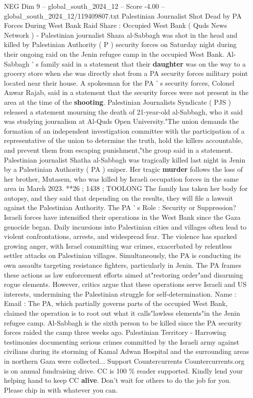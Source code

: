 \begin{textsample}{NEG Dim 9 – global\_south\_2024\_12 – Score -4.00 – global\_south\_2024\_12/119409807.txt}  \label{ex:f9_neg_220}
Palestinian Journalist Shot Dead by PA Forces During West Bank Raid Share : Occupied West Bank ( Quds News Network ) - Palestinian journalist Shaza al-Sabbagh was shot in the head and killed by Palestinian Authority ( P ) security forces on Saturday night during their ongoing raid on the Jenin refugee camp in the occupied West Bank.
Al-Sabbagh ' s family said in a statement that their \textbf{daughter} was on the way to a grocery store when she was directly shot from a PA security forces military point located near their house.
A spokesman for the PA ' s security forces, Colonel Anwar Rajab, said in a statement that the security forces were not present in the area at the time of the \textbf{shooting}.
Palestinian Journalists Syndicate ( PJS ) released a statement mourning the death of 21-year-old al-Sabbagh, who it said was studying journalism at Al-Quds Open University."The union demands the formation of an independent investigation committee with the participation of a representative of the union to determine the truth, hold the killers accountable, and prevent them from escaping punishment,"the group said in a statement.
Palestinian journalist Shatha al-Sabbagh was tragically killed last night in Jenin by a Palestinian Authority ( PA ) sniper.
Her tragic \textbf{murder} follows the loss of her brother, Mutasem, who was killed by Israeli occupation forces in the same area in March 2023. **26 ; 1438 ; TOOLONG The family has taken her body for autopsy, and they said that depending on the results, they will file a lawsuit against the Palestinian Authority.
The PA ' s Role : Security or Suppression?
Israeli forces have intensified their operations in the West Bank since the Gaza genocide began.
Daily incursions into Palestinian cities and villages often lead to violent confrontations, arrests, and widespread fear.
The violence has sparked growing anger, with Israel committing war crimes, exacerbated by relentless settler attacks on Palestinian villages.
Simultaneously, the PA is conducting its own assaults targeting resistance fighters, particularly in Jenin.
The PA frames these actions as law enforcement efforts aimed at"restoring order"and disarming rogue elements.
However, critics argue that these operations serve Israeli and US interests, undermining the Palestinian struggle for self-determination.
Name : Email : The PA, which partially governs parts of the occupied West Bank, claimed the operation is to root out what it calls"lawless elements"in the Jenin refugee camp.
Al-Sabbagh is the sixth person to be killed since the PA security forces raided the camp three weeks ago.
Palestinian Territory - Harrowing testimonies documenting serious crimes committed by the Israeli army against civilians during its storming of Kamal Adwan Hospital and the surrounding areas in northern Gaza were collected...
Support Countercurrents Countercurrents.org is on annual fundraising drive.
CC is 100 \% reader supported.
Kindly lend your helping hand to keep CC \textbf{alive}.
Don't wait for others to do the job for you.
Please chip in with whatever you can.

\end{textsample}
